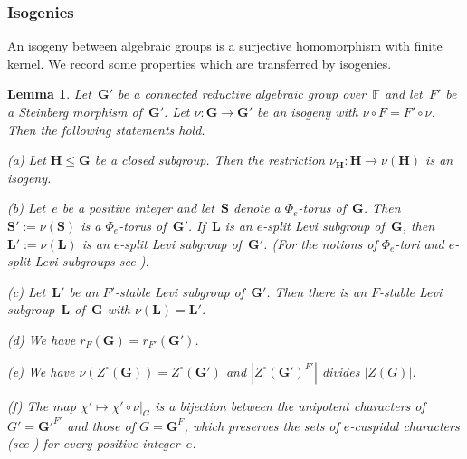 \documentclass[12pt]{amsart}
\newcommand{\bG}{{\mathbf{G}}}      %
\newcommand{\bL}{{\mathbf{L}}}
\newcommand{\bH}{{\mathbf{H}}}
\newcommand{\bS}{{\mathbf{S}}}
\newtheorem{lem}[thm]{Lemma}
\theoremstyle{theorem}
\theoremstyle{definition}
\theoremstyle{remark}
\begin{document}
\addtocounter{subsubsection}{4}
\subsubsection{Isogenies}
An isogeny between algebraic groups is a surjective homomorphism with finite 
kernel. We record some properties which are transferred by isogenies.
\addtocounter{thm}{1}
\begin{lem}
\label{RelativeRankAndIsogenies}
Let~$\bG'$ be a connected reductive algebraic group over~$\mathbb{F}$ and 
let~$F'$ be a Steinberg morphism of~$\bG'$. 
Let $\nu : \bG \rightarrow \bG'$ be an isogeny with 
$\nu \circ F = F' \circ \nu$. Then the following statements hold.

{\rm (a)} Let $\bH \leq \bG$ be a closed subgroup. Then the restriction
          $\nu_{\bH} : \bH \rightarrow \nu( \bH )$ is an isogeny.

{\rm (b)} Let~$e$ be a positive integer and let~$\bS$ denote a $\Phi_e$-torus 
of~$\bG$. Then $\bS' := \nu( \bS )$ is a $\Phi_e$-torus of~$\bG'$. 
If~$\bL$ is an $e$-split Levi subgroup of~$\bG$, then $\bL' := \nu( \bL )$ is
an $e$-split Levi subgroup of~$\bG'$. (For the notions of $\Phi_e$-tori and 
$e$-split Levi subgroups see \cite{BrouMa}).

{\rm (c)} Let~$\bL'$ be an $F'$-stable Levi subgroup of~$\bG'$. Then there is 
an $F$-stable Levi subgroup~$\bL$ of~$\bG$ with $\nu(\bL ) = \bL'$.

{\rm (d)} We have $r_F( \bG ) = r_{F'}( \bG' )$.

{\rm (e)} We have $\nu( Z^{\circ}( \bG ) ) = Z^{\circ}( \bG' )$ and 
$|Z^{\circ}( \bG' )^{F'}|$ divides $|Z(G)|$. 

{\rm (f)} The map $\chi' \mapsto \chi' \circ \nu|_G$ is a bijection between the 
unipotent characters of $G' = {\bG'}^{F'}$ and those of $G = {\bG}^{F}$, which 
preserves the sets of $e$-cuspidal characters (see
 \cite[Definition~$3.5.19$]{GeMa}) for every positive integer~$e$.
\end{lem}
\end{document}
